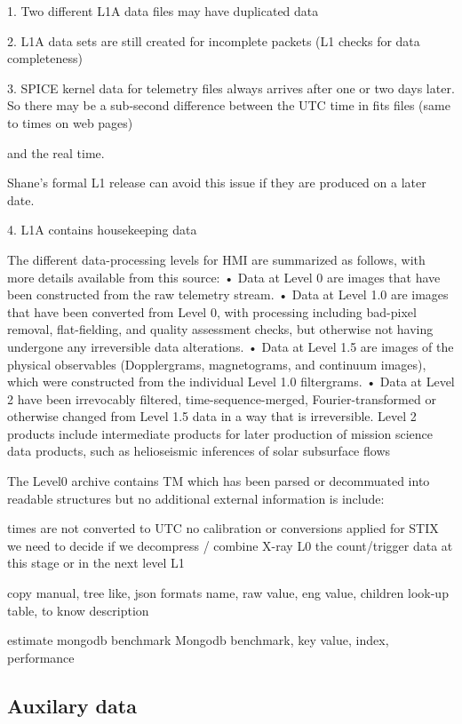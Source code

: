 \documentclass{aa}
\begin{document}
1.  Two different L1A data files may have duplicated data

2.  L1A data sets are still created for incomplete packets  (L1 checks for data completeness)

3.  SPICE kernel data for telemetry files always arrives  after one or two days later.
    So  there may be a sub-second difference between the UTC time in fits files (same to times on web pages)

   and the real time.

    Shane's formal L1 release can avoid this issue if they are produced on a later date.

4. L1A contains housekeeping data

The different data-processing levels for HMI are summarized as follows, with more details available from this source:
• Data at Level 0 are images that have been constructed from the raw telemetry stream.
• Data at Level 1.0 are images that have been converted from Level 0, with processing including bad-pixel removal, flat-fielding,
and quality assessment checks, but otherwise not having undergone any irreversible data alterations.
• Data at Level 1.5 are images of the physical observables (Dopplergrams, magnetograms, and continuum images), which were
constructed from the individual Level 1.0 filtergrams.
• Data at Level 2 have been irrevocably filtered, time-sequence-merged, Fourier-transformed or otherwise changed from Level 1.5
data in a way that is irreversible. Level 2 products include intermediate products for later production of mission science data
products, such as helioseismic inferences of solar subsurface flows


The Level0 archive contains TM which has been parsed or decommuated into readable structures but no additional external information is include:

times are not converted to UTC
no calibration or conversions applied
for STIX we need to decide if we decompress / combine X-ray L0 the count/trigger data at this stage or in the next level L1

copy manual,
tree like, 
json formats
name, raw value, eng value, children
look-up table, to know description

estimate mongodb benchmark
Mongodb benchmark,
key value, index, performance


\subsection{Auxilary data}
\end{document}
